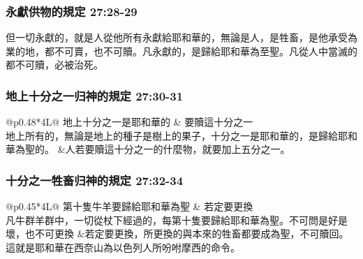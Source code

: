 \subsubsection{永獻供物的規定 27:28-29}
但一切永獻的，就是人從他所有永獻給耶和華的，無論是人，是牲畜，是他承受為業的地，都不可賣，也不可贖。凡永獻的，是歸給耶和華為至聖。凡從人中當滅的都不可贖，必被治死。

\subsubsection{地上十分之一归神的規定 27:30-31}
\begin{table}[H]
\begin{threeparttable}
\begin{tabular}{@{}p{}*{4}{L{\tabcolsep\relax}}@{}}
\toprule
地上十分之一是耶和華的 & 要贖這十分之一 \\\hline
地上所有的，無論是地上的種子是樹上的果子，十分之一是耶和華的，是歸給耶和華為聖的。
&人若要贖這十分之一的什麼物，就要加上五分之一。\\\hline
\bottomrule
\end{tabular}
\caption{地上十分之一归神的規定}
\end{threeparttable}
\end{table} 

\subsubsection{十分之一牲畜归神的規定 27:32-34}
\begin{table}[H]
\begin{threeparttable}
\begin{tabular}{@{}p{}*{4}{L{\tabcolsep\relax}}@{}}
\toprule
第十隻牛羊要歸給耶和華為聖 & 若定要更換 \\\hline
凡牛群羊群中，一切從杖下經過的，每第十隻要歸給耶和華為聖。不可問是好是壞，也不可更換
&若定要更換，所更換的與本來的牲畜都要成為聖，不可贖回。這就是耶和華在西奈山為以色列人所吩咐摩西的命令。\\\hline
\bottomrule
\end{tabular}
\caption{十分之一牲畜归神的規定}
\end{threeparttable}
\end{table} 


